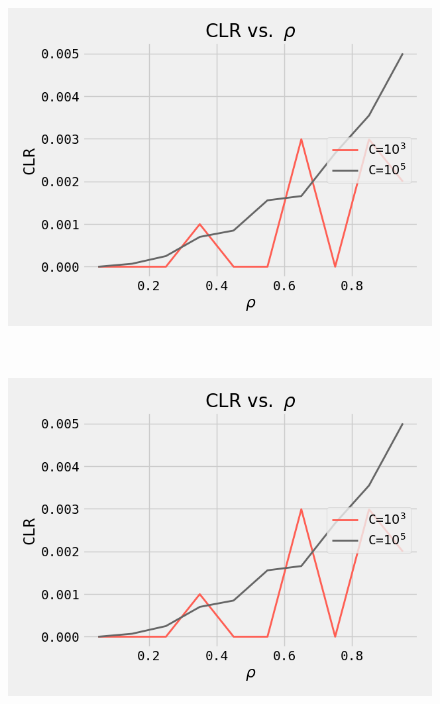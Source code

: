\begin{figure}[ht!]
 \centering
 \begin{minipage}[]{0.48\linewidth}
  \centering
 \includegraphics[width=\linewidth]{Figures/task1.png}
 \label{fig1} 
 \end{minipage}~~~~\begin{minipage}  []{0.48\linewidth}
  \centering
  \includegraphics[width=\linewidth]{Figures/task1.png}
  \label{fig2}
 \end{minipage}
\end{figure}
